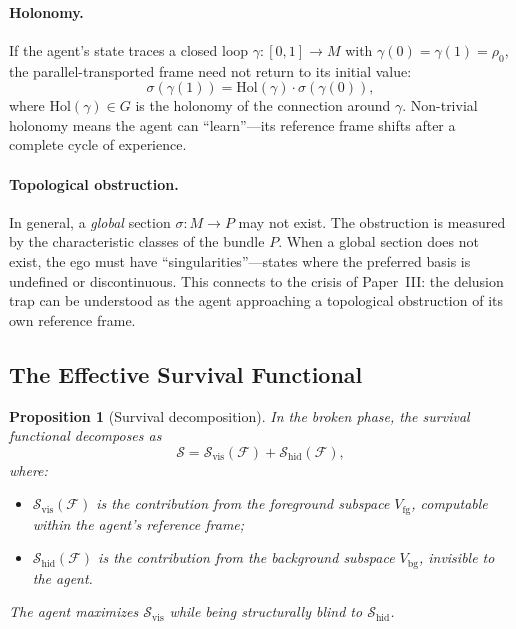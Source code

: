 \documentclass[12pt,a4paper,openany]{book}
\newtheorem{proposition}[theorem]{Proposition}
\begin{document}
\paragraph{Holonomy.}
If the agent's state traces a closed loop
$\gamma: [0,1] \to M$ with $\gamma(0) = \gamma(1) = \rho_0$,
the parallel-transported frame need not return to its
initial value:
\begin{equation}
\label{T-II-eq:holonomy}
\sigma(\gamma(1))
= \mathrm{Hol}(\gamma) \cdot \sigma(\gamma(0)),
\end{equation}
where $\mathrm{Hol}(\gamma) \in G$ is the holonomy of the
connection around $\gamma$.
Non-trivial holonomy means the agent can ``learn''---its
reference frame shifts after a complete cycle of experience.

\paragraph{Topological obstruction.}
In general, a \emph{global} section $\sigma: M \to P$ may
not exist.
The obstruction is measured by the characteristic classes of
the bundle $P$.
When a global section does not exist, the ego must have
``singularities''---states where the preferred basis is
undefined or discontinuous.
This connects to the crisis of Paper~III: the delusion trap
can be understood as the agent approaching a topological
obstruction of its own reference frame.

\subsection{The Effective Survival Functional}
\label{T-II-subsec:effective}

\begin{proposition}[Survival decomposition]
\label{T-II-prop:decomp}
In the broken phase, the survival functional decomposes as
\begin{equation}
\label{T-II-eq:decomp}
\mathcal{S}
= \mathcal{S}_{\mathrm{vis}}(\mathcal{F})
  + \mathcal{S}_{\mathrm{hid}}(\mathcal{F}),
\end{equation}
where:
\begin{itemize}
\item $\mathcal{S}_{\mathrm{vis}}(\mathcal{F})$
  is the contribution from the foreground subspace
  $V_{\mathrm{fg}}$, computable within the agent's
  reference frame;
\item $\mathcal{S}_{\mathrm{hid}}(\mathcal{F})$
  is the contribution from the background subspace
  $V_{\mathrm{bg}}$, invisible to the agent.
\end{itemize}
The agent maximizes $\mathcal{S}_{\mathrm{vis}}$ while
being structurally blind to
$\mathcal{S}_{\mathrm{hid}}$.
\end{proposition}
\end{document}
